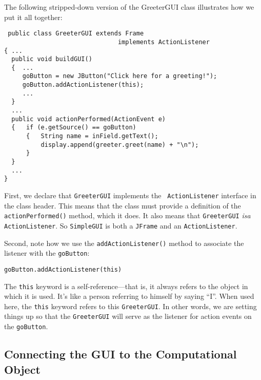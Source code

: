 The following stripped-down version of the GreeterGUI class illustrates
how we put it all together:

\begin{jjjlisting}
\begin{lstlisting}
 public class GreeterGUI extends Frame 
                               implements ActionListener 
{ ...
  public void buildGUI() 
  {  ...
     goButton = new JButton("Click here for a greeting!");
     goButton.addActionListener(this);
     ...
  }
  ...
  public void actionPerformed(ActionEvent e) 
  {   if (e.getSource() == goButton) 
      {   String name = inField.getText();
          display.append(greeter.greet(name) + "\n");
      }
  }
  ...
}
\end{lstlisting}
\end{jjjlisting}

\noindent First, we declare that {\tt GreeterGUI} implements the {\tt
ActionListener} interface in the class header. This means that the
class must provide a definition of the {\tt actionPerformed()} method,
which it does.  It also means that {\tt GreeterGUI} {\em isa} {\tt
ActionListener}.  So {\tt SimpleGUI} is both a {\tt JFrame} and an
{\tt ActionListener}.

Second, note how we use the {\tt addActionListener()} method to
associate the listener with the {\tt goButton}: 

\begin{jjjlisting}
\begin{lstlisting}
goButton.addActionListener(this)
\end{lstlisting}
\end{jjjlisting}

The {\tt this} keyword is a self-reference---that is, it always refers
to the object in which it is used. It's like a person referring to
himself by saying ``I''.  When used here, the {\tt this} keyword
refers to this {\tt GreeterGUI}.  In other words, we are setting
things up so that the {\tt GreeterGUI} will serve as the listener for
action events on the {\tt goButton}.


\pagebreak
\subsection{Connecting the GUI to the Computational Object}

